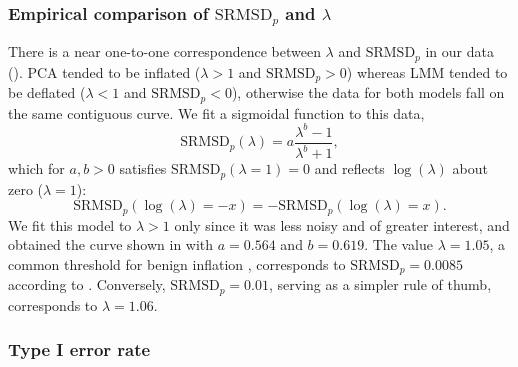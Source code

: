 \documentclass[9pt,lineno]{elife}
\newcommand{\rmsd}{\text{SRMSD}_p}
\begin{document}
\begin{appendixbox}
  \subsubsection{Empirical comparison of $\rmsd$ and $\lambda$}

  There is a near one-to-one correspondence between $\lambda$ and $\rmsd$ in our data ().
  PCA tended to be inflated ($\lambda > 1$ and $\rmsd > 0$) whereas LMM tended to be deflated ($\lambda < 1$ and $\rmsd < 0$), otherwise the data for both models fall on the same contiguous curve.
  We fit a sigmoidal function to this data,
  \begin{equation}
    \label{eq:rmsd-vs-lambda-sigmoidal}
    \rmsd( \lambda ) = a \frac{ \lambda^b - 1 }{ \lambda^b + 1 },
  \end{equation}
  which for $a,b > 0$ satisfies $\rmsd( \lambda = 1 ) = 0$ and reflects $\log( \lambda )$ about zero ($\lambda = 1$):
    $$
    \rmsd( \log( \lambda ) = -x ) = - \rmsd( \log( \lambda ) = x ).
    $$
  We fit this model to $\lambda > 1$ only since it was less noisy and of greater interest, and obtained the curve shown in  with $a = 0.564$ and $b = 0.619$.
  The value $\lambda = 1.05$, a common threshold for benign inflation \citep{price_new_2010}, corresponds to $\rmsd = 0.0085$ according to .
  Conversely, $\rmsd = 0.01$, serving as a simpler rule of thumb, corresponds to $\lambda = 1.06$.

  \subsubsection{Type I error rate}


\end{appendixbox}
\end{document}
